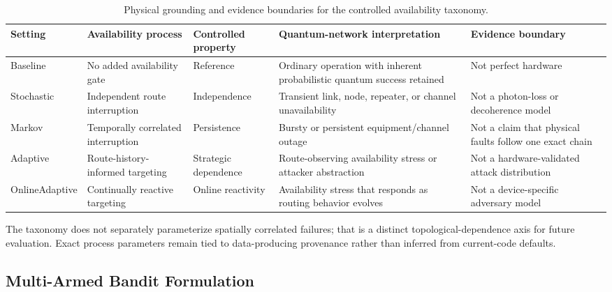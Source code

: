 \documentclass[10pt,journal]{IEEEtran}
\newcommand{\devroop}[1]{\textcolor{magenta}{\textit{[Devroop: #1]}}}
\newcommand{\dan}[1]{\textcolor{blue}{\textit{[Dan: #1]}}}
\begin{document}

\begin{table}[t]
\centering\footnotesize
\setlength{\tabcolsep}{3pt}
\caption{Physical grounding and evidence boundaries for the controlled availability taxonomy.}
\label{tab:threat_grounding}
\begin{tabular}{p{}p{}p{}p{}p{}}
\toprule
\textbf{Setting} & \textbf{Availability process} & \textbf{Controlled property} & \textbf{Quantum-network interpretation} & \textbf{Evidence boundary}\\
\midrule
Baseline & No added availability gate & Reference & Ordinary operation with inherent probabilistic quantum success retained & Not perfect hardware\\
Stochastic & Independent route interruption & Independence & Transient link, node, repeater, or channel unavailability & Not a photon-loss or decoherence model\\
Markov & Temporally correlated interruption & Persistence & Bursty or persistent equipment/channel outage & Not a claim that physical faults follow one exact chain\\
Adaptive & Route-history-informed targeting & Strategic dependence & Route-observing availability stress or attacker abstraction & Not a hardware-validated attack distribution\\
OnlineAdaptive & Continually reactive targeting & Online reactivity & Availability stress that responds as routing behavior evolves & Not a device-specific adversary model\\
\bottomrule
\end{tabular}
\end{table}
The taxonomy does not separately parameterize spatially correlated failures; that is a distinct topological-dependence axis for future evaluation. Exact process parameters remain tied to data-producing provenance rather than inferred from current-code defaults.

\subsection{Multi-Armed Bandit Formulation}
\label{subsec:mab}
\end{document}
